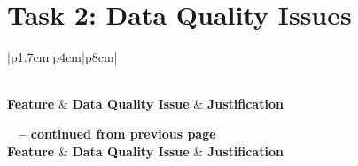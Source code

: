 \documentclass[11pt]{article}
\begin{document}
\section*{Task 2: Data Quality Issues}
\begin{longtable}{|p{1.7cm}|p{4cm}|p{8cm}|}
	\caption{Feature Quality Issues} \label{tab:feature_quality_issues} \\
	\hline
	\textbf{Feature} & \textbf{Data Quality Issue} & \textbf{Justification} \\
	\hline
	\endfirsthead
	
	{{\bfseries \tablename\ \thetable{} -- continued from previous page}} \\
	\hline
	\textbf{Feature} & \textbf{Data Quality Issue} & \textbf{Justification} \\
	\hline
	\endhead
	
	\hline {} \\ \hline
	\endfoot
	

\end{longtable}
\end{document}
